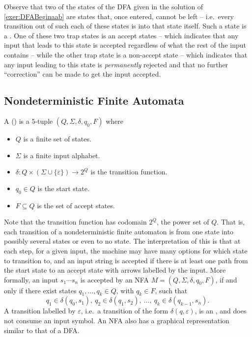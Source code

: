 Observe that two of the states of the DFA given in the solution of \cref{exer:DFABeginaab} are states that, once entered, cannot be left -- i.e.\ every transition out of such each of these states is into that state itself. Such a state is a . One of these two trap states is an accept states -- which indicates that any input that leads to this state is accepted regardless of what the rest of the input contains -- while the other trap state is a non-accept state -- which indicates that any input leading to this state is \emph{permanently} rejected and that no further ``correction'' can be made to get the input accepted.

\subsection{Nondeterministic Finite Automata}\label{subsec:NFA}

A  () is a $5$-tuple $(Q, \Sigma, \delta, q_0, F)$ where
\begin{itemize}
\item $Q$ is a finite set of states.
\item $\Sigma$ is a finite input alphabet.
\item $\delta \colon Q \times (\Sigma \cup \{\varepsilon\}) \to 2^Q$ is the transition function.
\item $q_0 \in Q$ is the start state.
\item $F \subseteq Q$ is the set of accept states.
\end{itemize}

Note that the transition function has codomain $2^Q$, the power set of $Q$. That is, each transition of a nondeterministic finite automaton is from one state into possibly several states or even to no state. The interpretation of this is that at each step, for a given input, the machine may have many options for which state to transition to, and an input string is accepted if there is at least one path from the start state to an accept state with arrows labelled by the input. More formally, an input $s_1 \cdots s_n$ is accepted by an NFA $M = (Q, \Sigma, \delta, q_0, F)$, if and only if there exist states $q_1, \ldots, q_k \in Q$, with $q_k \in F$, such that
\begin{equation*}
q_1 \in \delta(q_0, s_1),~ q_2 \in \delta(q_1, s_2),~ \ldots,~ q_k \in \delta(q_{k-1}, s_n).
\end{equation*}
A transition labelled by $\varepsilon$, i.e.\ a transition of the form $\delta(q, \varepsilon)$, is an , and does not consume an input symbol. An NFA also has a graphical representation similar to that of a DFA.

